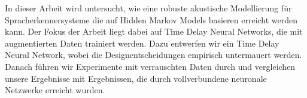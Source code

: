 
\abstract
In dieser Arbeit wird untersucht, wie eine robuste akustische Modellierung für Spracherkennersysteme die auf Hidden Markov Models basieren erreicht werden kann. Der Fokus der Arbeit liegt dabei auf Time Delay Neural Networks, die mit augmentierten Daten trainiert werden. Dazu entwerfen wir ein Time Delay Neural Network, wobei die Designentscheidungen empirisch untermauert werden. Danach führen wir Experimente mit verrauschten Daten durch und vergleichen unsere Ergebnisse mit Ergebnissen, die durch vollverbundene neuronale Netzwerke erreicht wurden. 